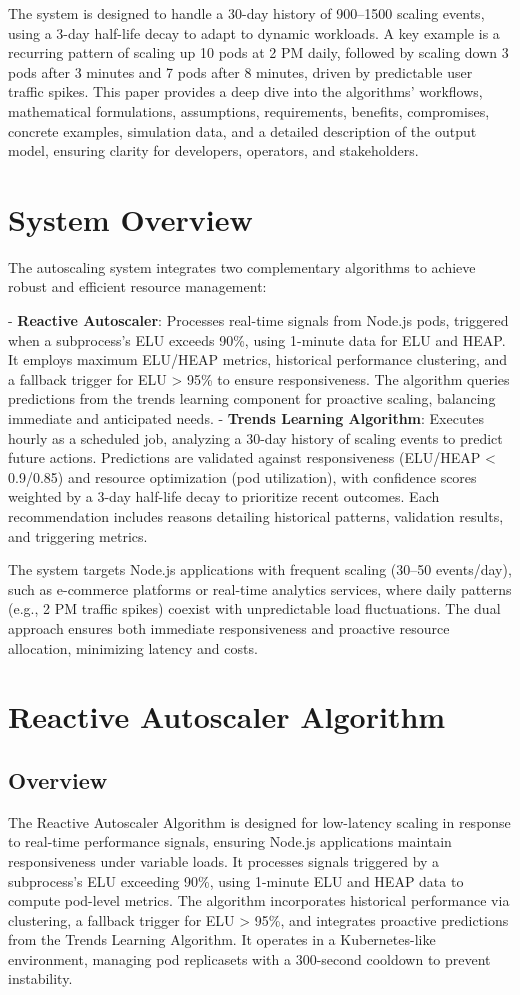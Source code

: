 \documentclass[12pt]{article}
\begin{document}
The system is designed to handle a 30-day history of 900–1500 scaling events, using a 3-day half-life decay to adapt to dynamic workloads. A key example is a recurring pattern of scaling up 10 pods at 2 PM daily, followed by scaling down 3 pods after 3 minutes and 7 pods after 8 minutes, driven by predictable user traffic spikes. This paper provides a deep dive into the algorithms’ workflows, mathematical formulations, assumptions, requirements, benefits, compromises, concrete examples, simulation data, and a detailed description of the output model, ensuring clarity for developers, operators, and stakeholders.

\section{System Overview}
The autoscaling system integrates two complementary algorithms to achieve robust and efficient resource management:

- \textbf{Reactive Autoscaler}: Processes real-time signals from Node.js pods, triggered when a subprocess’s ELU exceeds 90\%, using 1-minute data for ELU and HEAP. It employs maximum ELU/HEAP metrics, historical performance clustering, and a fallback trigger for ELU > 95\% to ensure responsiveness. The algorithm queries predictions from the trends learning component for proactive scaling, balancing immediate and anticipated needs.
- \textbf{Trends Learning Algorithm}: Executes hourly as a scheduled job, analyzing a 30-day history of scaling events to predict future actions. Predictions are validated against responsiveness (ELU/HEAP < 0.9/0.85) and resource optimization (pod utilization), with confidence scores weighted by a 3-day half-life decay to prioritize recent outcomes. Each recommendation includes reasons detailing historical patterns, validation results, and triggering metrics.

The system targets Node.js applications with frequent scaling (30–50 events/day), such as e-commerce platforms or real-time analytics services, where daily patterns (e.g., 2 PM traffic spikes) coexist with unpredictable load fluctuations. The dual approach ensures both immediate responsiveness and proactive resource allocation, minimizing latency and costs.

\section{Reactive Autoscaler Algorithm}
\subsection{Overview}
The Reactive Autoscaler Algorithm is designed for low-latency scaling in response to real-time performance signals, ensuring Node.js applications maintain responsiveness under variable loads. It processes signals triggered by a subprocess’s ELU exceeding 90\%, using 1-minute ELU and HEAP data to compute pod-level metrics. The algorithm incorporates historical performance via clustering, a fallback trigger for ELU > 95\%, and integrates proactive predictions from the Trends Learning Algorithm. It operates in a Kubernetes-like environment, managing pod replicasets with a 300-second cooldown to prevent instability.
\end{document}
